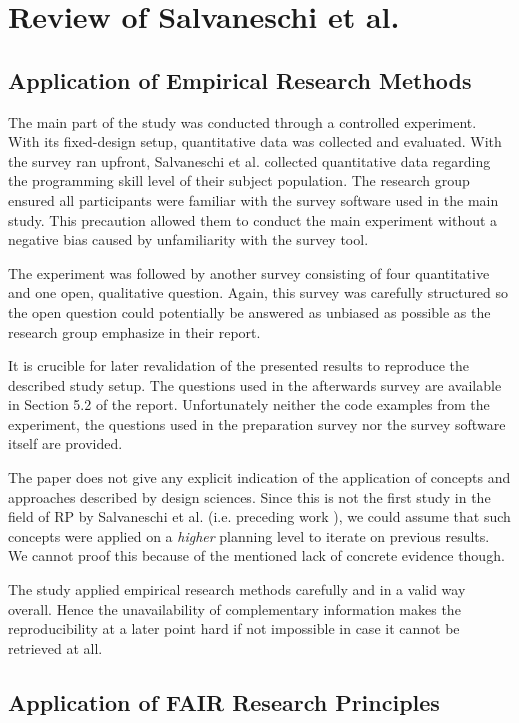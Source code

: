 \documentclass[12pt,a4paper]{article}
\begin{document}
\section{Review of Salvaneschi et al.}
\label{sec:review}

\subsection{Application of Empirical Research Methods}

The main part of the study was conducted through a controlled experiment. With its fixed-design setup, quantitative data was collected and evaluated. With the survey ran upfront, Salvaneschi et al. collected quantitative data regarding the programming skill level of their subject population. The research group ensured all participants were familiar with the survey software used in the main study. This precaution allowed them to conduct the main experiment without a negative bias caused by unfamiliarity with the survey tool.

The experiment was followed by another survey consisting of four quantitative and one open, qualitative question. Again, this survey was carefully structured so the open question could potentially be answered as unbiased as possible as the research group emphasize in their report.

It is crucible for later revalidation of the presented results to reproduce the described study setup. The questions used in the afterwards survey are available in Section 5.2 of the report. Unfortunately neither the code examples from the experiment, the questions used in the preparation survey nor the survey software itself are provided.

The paper does not give any explicit indication of the application of concepts and approaches described by design sciences. Since this is not the first study in the field of RP by Salvaneschi et al. (i.e. preceding work \cite{Salvaneschi:2014:ESP:2635868.2635895}), we could assume that such concepts were applied on a \emph{higher} planning level to iterate on previous results. We cannot proof this because of the mentioned lack of concrete evidence though.

The study applied empirical research methods carefully and in a valid way overall. Hence the unavailability of complementary information makes the reproducibility at a later point hard if not impossible in case it cannot be retrieved at all.

\subsection{Application of FAIR Research Principles}
\end{document}
